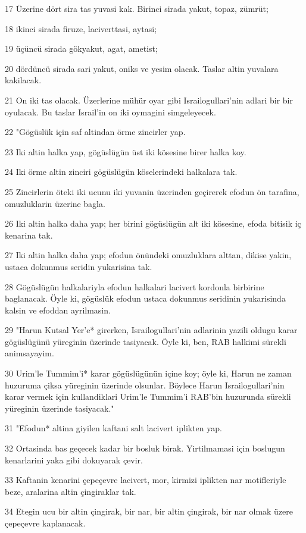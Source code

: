 \par 17 Üzerine dört sira tas yuvasi kak. Birinci sirada yakut, topaz, zümrüt;
\par 18 ikinci sirada firuze, laciverttasi, aytasi;
\par 19 üçüncü sirada gökyakut, agat, ametist;
\par 20 dördüncü sirada sari yakut, oniks ve yesim olacak. Taslar altin yuvalara kakilacak.
\par 21 On iki tas olacak. Üzerlerine mühür oyar gibi Israilogullari'nin adlari bir bir oyulacak. Bu taslar Israil'in on iki oymagini simgeleyecek.
\par 22 "Gögüslük için saf altindan örme zincirler yap.
\par 23 Iki altin halka yap, gögüslügün üst iki kösesine birer halka koy.
\par 24 Iki örme altin zinciri gögüslügün köselerindeki halkalara tak.
\par 25 Zincirlerin öteki iki ucunu iki yuvanin üzerinden geçirerek efodun ön tarafina, omuzluklarin üzerine bagla.
\par 26 Iki altin halka daha yap; her birini gögüslügün alt iki kösesine, efoda bitisik iç kenarina tak.
\par 27 Iki altin halka daha yap; efodun önündeki omuzluklara alttan, dikise yakin, ustaca dokunmus seridin yukarisina tak.
\par 28 Gögüslügün halkalariyla efodun halkalari lacivert kordonla birbirine baglanacak. Öyle ki, gögüslük efodun ustaca dokunmus seridinin yukarisinda kalsin ve efoddan ayrilmasin.
\par 29 "Harun Kutsal Yer'e* girerken, Israilogullari'nin adlarinin yazili oldugu karar gögüslügünü yüreginin üzerinde tasiyacak. Öyle ki, ben, RAB halkimi sürekli animsayayim.
\par 30 Urim'le Tummim'i* karar gögüslügünün içine koy; öyle ki, Harun ne zaman huzuruma çiksa yüreginin üzerinde olsunlar. Böylece Harun Israilogullari'nin karar vermek için kullandiklari Urim'le Tummim'i RAB'bin huzurunda sürekli yüreginin üzerinde tasiyacak."
\par 31 "Efodun* altina giyilen kaftani salt lacivert iplikten yap.
\par 32 Ortasinda bas geçecek kadar bir bosluk birak. Yirtilmamasi için boslugun kenarlarini yaka gibi dokuyarak çevir.
\par 33 Kaftanin kenarini çepeçevre lacivert, mor, kirmizi iplikten nar motifleriyle beze, aralarina altin çingiraklar tak.
\par 34 Etegin ucu bir altin çingirak, bir nar, bir altin çingirak, bir nar olmak üzere çepeçevre kaplanacak.
